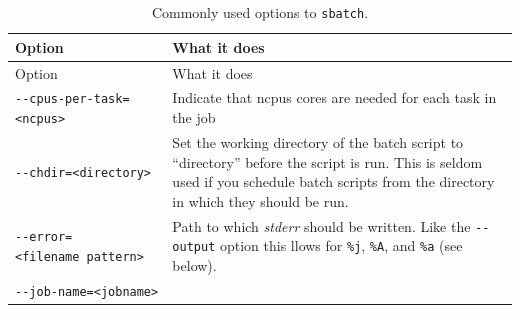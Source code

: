 \documentclass[]{krantz}
\begin{document}
\begin{longtable}[]{@{}ll@{}}
\caption{\label{tab:sbatchopts} Commonly used options to \texttt{sbatch}.}\tabularnewline
\toprule
\begin{minipage}[b]{0.44\columnwidth}\raggedright
Option\strut
\end{minipage} & \begin{minipage}[b]{0.46\columnwidth}\raggedright
What it does\strut
\end{minipage}\tabularnewline
\midrule
\endfirsthead
\toprule
\begin{minipage}[b]{0.44\columnwidth}\raggedright
Option\strut
\end{minipage} & \begin{minipage}[b]{0.46\columnwidth}\raggedright
What it does\strut
\end{minipage}\tabularnewline
\midrule
\endhead
\begin{minipage}[t]{0.44\columnwidth}\raggedright
\texttt{-\/-cpus-per-task=\textless{}ncpus\textgreater{}}\strut
\end{minipage} & \begin{minipage}[t]{0.46\columnwidth}\raggedright
Indicate that ncpus cores are
needed for each task in the
job\strut
\end{minipage}\tabularnewline
\begin{minipage}[t]{0.44\columnwidth}\raggedright
\texttt{-\/-chdir=\textless{}directory\textgreater{}}\strut
\end{minipage} & \begin{minipage}[t]{0.46\columnwidth}\raggedright
Set the working directory of
the batch script to
``directory'' before the script
is run. This is seldom used
if you schedule batch scripts
from the directory in which
they should be run.\strut
\end{minipage}\tabularnewline
\begin{minipage}[t]{0.44\columnwidth}\raggedright
\texttt{-\/-error=\textless{}filename\ pattern\textgreater{}}\strut
\end{minipage} & \begin{minipage}[t]{0.46\columnwidth}\raggedright
Path to which \emph{stderr} should
be written. Like the
\texttt{-\/-output} option this llows
for \texttt{\%j}, \texttt{\%A}, and \texttt{\%a} (see
below).\strut
\end{minipage}\tabularnewline
\begin{minipage}[t]{0.44\columnwidth}\raggedright
\texttt{-\/-job-name=\textless{}jobname\textgreater{}}\strut
\end{minipage} & \begin{minipage}[t]{0.46\columnwidth}\raggedright

\end{minipage}
\end{longtable}
\end{document}
